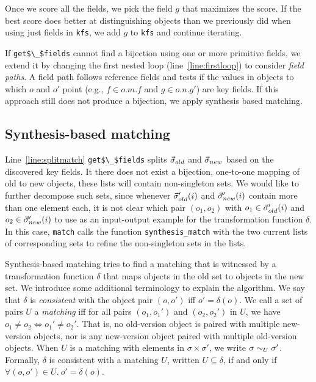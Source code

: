 \documentclass[natbib]{sigplanconf}
\newcommand{\code}[1]{\lstinline|#1|\xspace}
\newcommand{\kathryn}[1]{\textcolor{blue}{Kathryn: #1}}
\newcommand{\mwh}[1]{\textcolor{blue}{Mike: #1}}
\begin{document}
Once we score all the fields, we pick the
field $g$ that maximizes the score.  If the best score does better at
distinguishing objects than we previously did when using just fields
in \code{kfs}, we add $g$ to \code{kfs} and continue iterating.

If \code{get$\_$fields} cannot find a bijection using one or more primitive
fields, we extend it by changing the first nested loop
(line~\ref{line:firstloop}) to consider \emph{field paths}. A field
path follows reference fields and tests if the values in objects to
which $o$ and $o'$ point (e.g., $f \in o.m.f$ and $g \in o.n.g'$) are
key fields. If this approach still does not produce a bijection, we
apply synthesis based matching.


\subsection{Synthesis-based matching}
\label{sec:synth-match}

Line~\ref{line:splitmatch} \code{get$\_$fields} splits $\vec{\sigma}_{old}$
and $\vec{\sigma}_{new}$ based on the discovered key fields.  It there does
not exist a bijection, one-to-one mapping of old to new objects, these
lists will contain non-singleton sets.  We would like to further
decompose such sets, since whenever $\vec{\sigma}_{old}'(i)$ and
$\vec{\sigma}_{new}'(i)$ contain more than one element each, it is not
clear which pair $(o_1,o_2)$ with $o_1 \in \vec{\sigma}_{old}'(i)$ and $o_2
\in \vec{\sigma}_{new}'(i)$ to use as an input-output example
for the transformation function $\delta$. In this case, \code{match} calls the
function \code{synthesis_match} with the two current lists of
corresponding sets to refine the non-singleton sets in the
lists.

Synthesis-based matching tries to find a matching that is 
witnessed by a transformation function $\delta$ that maps objects in the
old set to objects in the new set.  We introduce some additional
terminology to explain the algorithm.  We say that $\delta$ is
\emph{consistent} with the object pair $(o,o')$ iff $o' = \delta(o)$.
We call a set of pairs $U$ a \emph{matching} iff for all pairs
$(o_1,o_1')$ and $(o_2, o_2')$ in $U$, we have $o_1 \neq o_2
\Leftrightarrow o_1' \neq o_2'$.  That is, no old-version object is
paired with multiple new-version objects, nor is any new-version
object paired with multiple old-version objects.  When $U$ is a
matching with elements in $\sigma \times \sigma'$, we write $\sigma
\sim_{U} \sigma'$.  Formally, $\delta$ is consistent with a
matching $U$, written $U \subseteq \delta $, if and only if $\forall
(o,o') \in U.\ o' = \delta(o)$.
\end{document}
